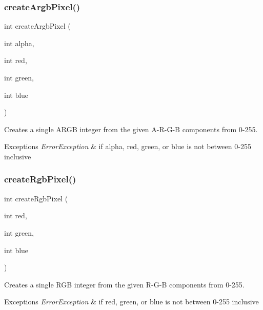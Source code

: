 \subsubsection{\texorpdfstring{create\+Argb\+Pixel()}{createArgbPixel()}}
{\footnotesize\ttfamily int create\+Argb\+Pixel (\begin{DoxyParamCaption}\item[{int}]{alpha,  }\item[{int}]{red,  }\item[{int}]{green,  }\item[{int}]{blue }\end{DoxyParamCaption})\hspace{0.3cm}{\ttfamily [static]}}



Creates a single A\+R\+GB integer from the given A-\/\+R-\/\+G-\/B components from 0-\/255. 


\begin{DoxyExceptions}{Exceptions}
{\em Error\+Exception} & if alpha, red, green, or blue is not between 0-\/255 inclusive \\
\hline
\end{DoxyExceptions}
\mbox{\label{classsgl_1_1GCanvas_a10beefcf8631433d0cdddefd4e24c76a}} 
\subsubsection{\texorpdfstring{create\+Rgb\+Pixel()}{createRgbPixel()}}
{\footnotesize\ttfamily int create\+Rgb\+Pixel (\begin{DoxyParamCaption}\item[{int}]{red,  }\item[{int}]{green,  }\item[{int}]{blue }\end{DoxyParamCaption})\hspace{0.3cm}{\ttfamily [static]}}



Creates a single R\+GB integer from the given R-\/\+G-\/B components from 0-\/255. 


\begin{DoxyExceptions}{Exceptions}
{\em Error\+Exception} & if red, green, or blue is not between 0-\/255 inclusive \\
\hline
\end{DoxyExceptions}
\mbox{\label{classsgl_1_1GCanvas_aa4e74e40eebb70c9616065056de5c4ca}} 
